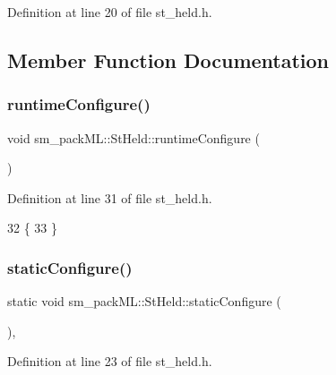 Definition at line 20 of file st\+\_\+held.\+h.



\subsection{Member Function Documentation}
\mbox{\label{structsm__packML_1_1StHeld_a58e225d37891ed694b2bf6da41bc802c}} 
\subsubsection{\texorpdfstring{runtime\+Configure()}{runtimeConfigure()}}
{\footnotesize\ttfamily void sm\+\_\+pack\+M\+L\+::\+St\+Held\+::runtime\+Configure (\begin{DoxyParamCaption}{ }\end{DoxyParamCaption})\hspace{0.3cm}{\ttfamily [inline]}}



Definition at line 31 of file st\+\_\+held.\+h.


\begin{DoxyCode}
32     \{
33     \}
\end{DoxyCode}
\mbox{\label{structsm__packML_1_1StHeld_a18fcebb225f7c4893932b8b9c3de4276}} 
\subsubsection{\texorpdfstring{static\+Configure()}{staticConfigure()}}
{\footnotesize\ttfamily static void sm\+\_\+pack\+M\+L\+::\+St\+Held\+::static\+Configure (\begin{DoxyParamCaption}{ }\end{DoxyParamCaption})\hspace{0.3cm}{\ttfamily [inline]}, {\ttfamily [static]}}



Definition at line 23 of file st\+\_\+held.\+h.


